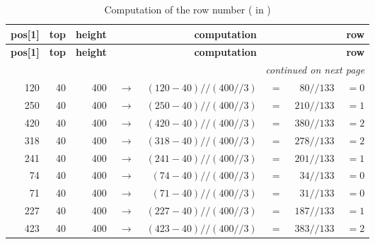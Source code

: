 \begin{longtable}{rrrcrcrr}
	\caption{Computation of the row number ( in )}\label{tabRowNumber}\\
	\toprule
	\textbf{pos[1]} & \textbf{top} & \textbf{height} & \multicolumn{4}{c}{\textbf{computation}} & \textbf{row}\\
	\midrule
	\endfirsthead
	
	\toprule
	\textbf{pos[1]} & \textbf{top} & \textbf{height} & \multicolumn{4}{c}{\textbf{computation}} & \textbf{row}\\
	\midrule
	\endhead
	
	\midrule
	\multicolumn{8}{r}{\emph{continued on next page}} \\
	\endfoot
	
	\bottomrule
	\endlastfoot
	
	120 & 40 & 400 & $\:\rightarrow\:$ & $(120 - 40) // (400 // 3)$ & $\:=\:$ & $80 // 133$  & $\:=0$ \\
	250 & 40 & 400 & $\:\rightarrow\:$ & $(250 - 40) // (400 // 3)$ & $\:=\:$ & $210 // 133$ & $\:=1$ \\
	420 & 40 & 400 & $\:\rightarrow\:$ & $(420 - 40) // (400 // 3)$ & $\:=\:$ & $380 // 133$ & $\:=2$ \\
	318 & 40 & 400 & $\:\rightarrow\:$ & $(318 - 40) // (400 // 3)$ & $\:=\:$ & $278 // 133$ & $\:=2$ \\
	241 & 40 & 400 & $\:\rightarrow\:$ & $(241 - 40) // (400 // 3)$ & $\:=\:$ & $201 // 133$ & $\:=1$ \\
	74  & 40 & 400 & $\:\rightarrow\:$ & $(74 - 40) // (400 // 3)$  & $\:=\:$ & $34 // 133$  & $\:=0$ \\
	71  & 40 & 400 & $\:\rightarrow\:$ & $(71 - 40) // (400 // 3)$  & $\:=\:$ & $31 // 133$  & $\:=0$ \\
	227 & 40 & 400 & $\:\rightarrow\:$ & $(227 - 40) // (400 // 3)$ & $\:=\:$ & $187 // 133$ & $\:=1$ \\
	423 & 40 & 400 & $\:\rightarrow\:$ & $(423 - 40) // (400 // 3)$ & $\:=\:$ & $383 // 133$ & $\:=2$ \\
\end{longtable}

